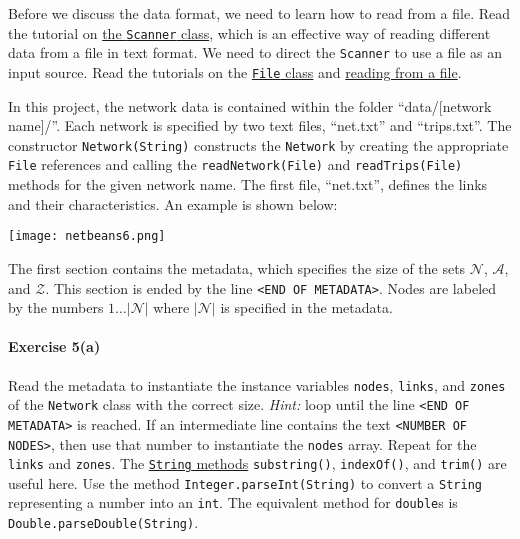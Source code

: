 \documentclass[12pt]{article}
\newcommand{\N}{\mathcal{N}}
\newcommand{\A}{\mathcal{A}}
\newcommand{\Z}{\mathcal{Z}}
\begin{document}
Before we discuss the data format, we need to learn how to read from a file. Read the tutorial on  \href{https://www.w3schools.com/java/java_user_input.asp}{the \texttt{Scanner} class}, which is an effective way of reading different data from a file in text format. We need to direct the \texttt{Scanner} to use a file as an input source. Read the tutorials on the \href{https://www.w3schools.com/java/java_files.asp}{\texttt{File} class} and \href{https://www.w3schools.com/java/java_files_read.asp}{reading from a file}. 

In this project, the network data is contained within the folder ``data/[network name]/''. Each network is specified by two text files, ``net.txt'' and ``trips.txt''.  The constructor \texttt{Network(String)} constructs the \texttt{Network} by creating the appropriate \texttt{File} references and calling the \texttt{readNetwork(File)} and \texttt{readTrips(File)} methods for the given network name. 
%
The first file, ``net.txt'', defines the links and their characteristics. An example is shown below:

\begin{center}
	\texttt{[image: netbeans6.png]}
\end{center}


\noindent The first section contains the metadata, which specifies the size of the sets $\N$, $\A$, and $\Z$. This section is ended by the line \texttt{<END OF METADATA>}. Nodes are labeled by the numbers $1\ldots \vert\N\vert$ where $\vert\N\vert$ is specified in the metadata. 




\paragraph*{Exercise 5(a)} Read the metadata to instantiate the instance variables \texttt{nodes}, \texttt{links}, and \texttt{zones} of the \texttt{Network} class with the correct size. \textit{Hint:} loop until the line \texttt{<END OF METADATA>} is reached. If an intermediate line contains the text \texttt{<NUMBER OF NODES>}, then use that number to instantiate the \texttt{nodes} array. Repeat for the \texttt{links} and \texttt{zones}. The \href{https://www.w3schools.com/java/java_ref_string.asp}{\texttt{String} methods} \texttt{substring()}, \texttt{indexOf()}, and \texttt{trim()} are useful here. Use the method \texttt{Integer.parseInt(String)} to convert a \texttt{String} representing a number into an \texttt{int}. The equivalent method for \texttt{double}s is \texttt{Double.parseDouble(String)}.
\end{document}
